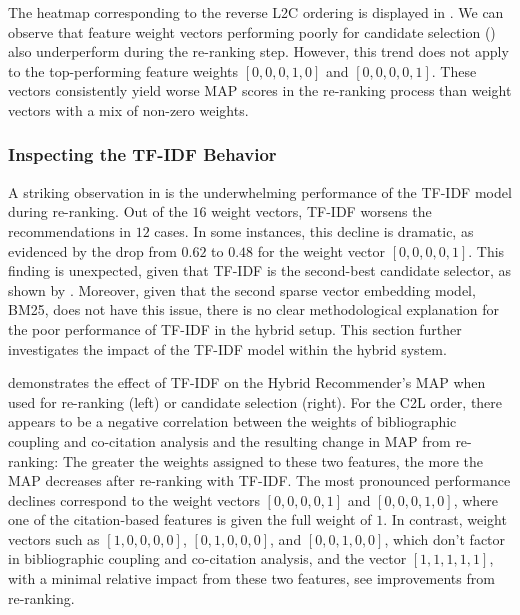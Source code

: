 The heatmap corresponding to the reverse \ac{L2C} ordering is displayed in .
We can observe that feature weight vectors performing poorly for candidate selection () also underperform during the re-ranking step. However, this trend does not apply to the top-performing feature weights $[0, 0, 0, 1, 0]$ and $[0, 0, 0, 0, 1]$. These vectors consistently yield worse \ac{MAP} scores in the re-ranking process than weight vectors with a mix of non-zero weights.


\subsubsection*{Inspecting the TF-IDF Behavior}

A striking observation in  is the underwhelming performance of the TF-IDF model during re-ranking. Out of the $16$ weight vectors, TF-IDF worsens the recommendations in $12$ cases. In some instances, this decline is dramatic, as evidenced by the drop from $0.62$ to $0.48$ for the weight vector $[0,0,0,0,1]$. This finding is unexpected, given that TF-IDF is the second-best candidate selector, as shown by . Moreover, given that the second sparse vector embedding model, BM25, does not have this issue, there is no clear methodological explanation for the poor performance of TF-IDF in the hybrid setup. This section further investigates the impact of the TF-IDF model within the hybrid system.

 demonstrates the effect of TF-IDF on the Hybrid Recommender's \ac{MAP} when used for re-ranking (left) or candidate selection (right).
For the \ac{C2L} order, there appears to be a negative correlation between the weights of bibliographic coupling and co-citation analysis and the resulting change in \ac{MAP} from re-ranking:
The greater the weights assigned to these two features, the more the \ac{MAP} decreases after re-ranking with TF-IDF.
The most pronounced performance declines correspond to the weight vectors $[0, 0, 0, 0, 1]$ and $[0, 0, 0, 1, 0]$, where one of the citation-based features is given the full weight of $1$.
In contrast, weight vectors such as $[1, 0, 0, 0, 0]$, $[0, 1, 0, 0, 0]$, and $[0, 0, 1, 0, 0]$, which don't factor in bibliographic coupling and co-citation analysis, and the vector $[1,1,1,1,1]$, with a minimal relative impact from these two features, see improvements from re-ranking.

